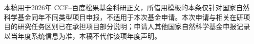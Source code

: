 \justifying
\NSFCBodyText

本稿用于2026年 CCF--百度松果基金科研正文，所借用模板的本条仅针对国家自然科学基金同年不同类型项目申报，不适用于本次基金申请。本次申请与相关在研项目的研究任务区别已在承担项目部分说明；申请人其他国家自然科学基金申报记录以当年度系统信息为准，本稿不代作该项年度声明。
